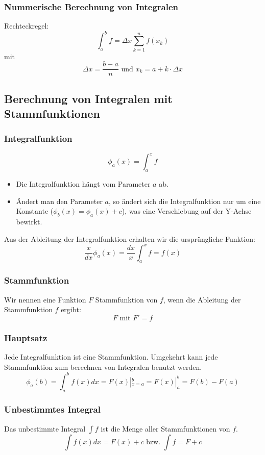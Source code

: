 \subsubsection{Nummerische Berechnung von Integralen}
Rechteckregel:
\[ \int^b_a f =  \Delta x \sum_{k=1}^{n}f(x_k) \]
mit
\[ \Delta x = \frac{b-a}{n} \text{ und } x_k = a + k \cdot \Delta x \]

\subsection{Berechnung von Integralen mit Stammfunktionen}
\subsubsection{Integralfunktion}
\[ \phi_a(x) = \int_a^x f \]
\begin{itemize}
  \item Die Integralfunktion hängt vom Parameter $a$ ab.
  \item Ändert man den Parameter $a$, so ändert sich die
  Integralfunktion nur um eine Konstante ($\phi_b(x) = \phi_a(x) + c$),
  was eine Verschiebung auf der Y-Achse bewirkt.
\end{itemize}

Aus der Ableitung der Integralfunktion erhalten wir die ursprüngliche Funktion:
\[ \frac{x}{dx} \phi_a(x) = \frac{dx}{x} \int_a^x f = f(x) \]

\subsubsection{Stammfunktion}
Wir nennen eine Funktion $F$ Stammfunktion von $f$, wenn die Ableitung
der Stammfunktion $f$ ergibt:
\[F \text{ mit } F' = f\]

\subsubsection{Hauptsatz}
Jede Integralfunktion ist eine Stammfunktion. Umgekehrt kann jede
Stammfunktion zum berechnen von Integralen benutzt werden.
\[\phi_a(b) = \int_a^b f(x)dx = F(x)|^b_{x=a} = F(x)|^b_a = F(b) - F(a) \]

\subsubsection{Unbestimmtes Integral}
Das unbestimmte Integral $\int f$ ist die Menge aller Stammfunktionen
von $f$.
\[ \int f(x) dx = F(x) + c \text{ bzw. } \int f = F + c\]

